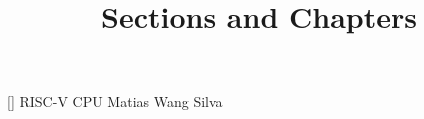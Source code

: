 \documentclass[12pt]{article}
\begin{document}
    []{
    \setheadrule{.55pt}%
            {RISC-V CPU}
            {Matias Wang Silva}
    }
    \pagestyle{main}
    \title{Sections and Chapters}
    \tableofcontents

    
    
    
\end{document}
